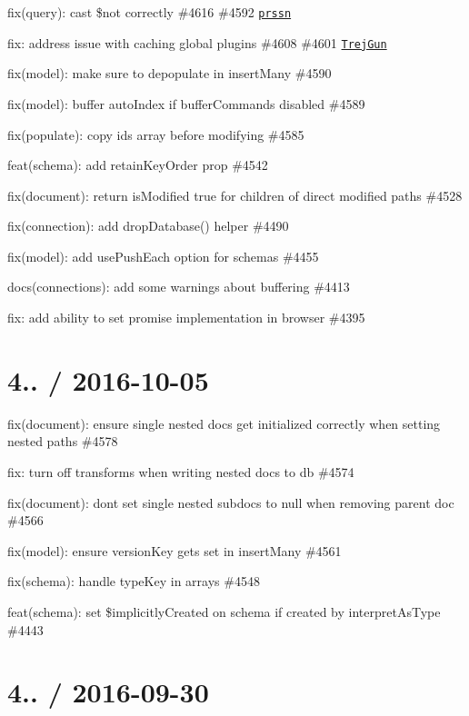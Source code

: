 \begin{DoxyItemize}
\item fix(query)\+: cast \$not correctly \#4616 \#4592 \href{https://github.com/prssn}{\tt prssn}
\item fix\+: address issue with caching global plugins \#4608 \#4601 \href{https://github.com/TrejGun}{\tt Trej\+Gun}
\item fix(model)\+: make sure to depopulate in insert\+Many \#4590
\item fix(model)\+: buffer auto\+Index if buffer\+Commands disabled \#4589
\item fix(populate)\+: copy ids array before modifying \#4585
\item feat(schema)\+: add retain\+Key\+Order prop \#4542
\item fix(document)\+: return is\+Modified true for children of direct modified paths \#4528
\item fix(connection)\+: add drop\+Database() helper \#4490
\item fix(model)\+: add use\+Push\+Each option for schemas \#4455
\item docs(connections)\+: add some warnings about buffering \#4413
\item fix\+: add ability to set promise implementation in browser \#4395
\end{DoxyItemize}

\section*{4.. / 2016-\/10-\/05 }


\begin{DoxyItemize}
\item fix(document)\+: ensure single nested docs get initialized correctly when setting nested paths \#4578
\item fix\+: turn off transforms when writing nested docs to db \#4574
\item fix(document)\+: don\textquotesingle{}t set single nested subdocs to null when removing parent doc \#4566
\item fix(model)\+: ensure version\+Key gets set in insert\+Many \#4561
\item fix(schema)\+: handle type\+Key in arrays \#4548
\item feat(schema)\+: set \$implicitly\+Created on schema if created by interpret\+As\+Type \#4443
\end{DoxyItemize}

\section*{4.. / 2016-\/09-\/30 }



